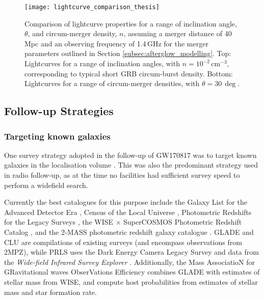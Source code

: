 \begin{figure}
    \centering
    \texttt{[image: lightcurve\_comparison\_thesis]}\vspace{-6pt}
    \caption[Comparison of radio afterglows for a range of merger properties]{Comparison of lightcurve properties for a range of inclination angle, $\theta$, and circum-merger density, $n$, assuming a merger distance of 40\,Mpc and an observing frequency of 1.4\,GHz for the merger parameters outlined in Section \ref{subsec:afterglow_modelling}. Top: Lightcurves for a range of inclination angles, with $n=10^{-2}\,$cm$^{-3}$, corresponding to typical short GRB circum-burst density. Bottom: Lightcurves for a range of circum-merger densities, with $\theta=30\,\deg$.}
    \label{fig:lightcurve_comparison}
\end{figure}
\vspace{-6pt}
\subsection{Follow-up Strategies}
\label{subsec:strats}
\subsubsection{Targeting known galaxies}
\label{subsubsec:galaxy_targeting}
\vspace{-6pt}
One survey strategy adopted in the follow-up of GW170817 was to target known galaxies in the localisation volume \citep[e.g.,][]{2017PASA...34...69A,2017Natur.551...64A,2017Sci...358.1556C,2017ApJ...848L..29D,2017Sci...358.1565E,2017ApJ...848L..24V}. This was also the predominant strategy used in radio follow-up, as at the time no facilities had sufficient survey speed to perform a widefield search.

Currently the best catalogues for this purpose include the Galaxy List for the Advanced Detector Era \citep[GLADE;][]{2018MNRAS.479.2374D}, Census of the Local Universe \citep[CLU;][]{2019ApJ...880....7C}, Photometric Redshifts for the Legacy Surveys \citep[PRLS;][]{2020arXiv200106018Z}, the WISE $\times$ SuperCOSMOS Photometric Redshift Catalog \citep{2016ApJS..225....5B}, and the 2-MASS photometric redshift galaxy catalogue \citep[2MPZ;][]{2014ApJS..210....9B}. GLADE and CLU are compilations of existing surveys (and encompass observations from 2MPZ), while PRLS uses the Dark Energy Camera Legacy Survey \citep{2019AJ....157..168D} and data from the \textit{Wide-field Infrared Survey Explorer} \citep[WISE;][]{2010AJ....140.1868W}. Additionally, the Mass AssociatioN for GRavitational waves ObserVations Efficiency \citep[MANGROVE;][]{2020MNRAS.492.4768D} combines GLADE with estimates of stellar mass from WISE, and \citet{2020arXiv200211214A} compute host probabilities from estimates of stellar mass and star formation rate.

